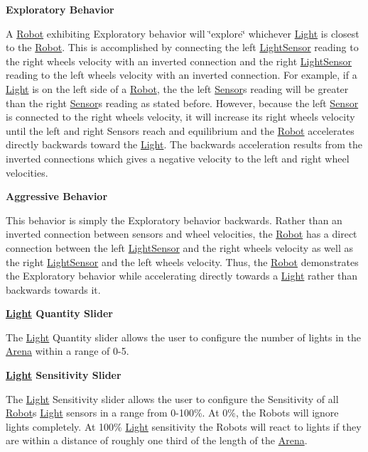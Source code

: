 {\bfseries Exploratory Behavior}

A \hyperlink{classRobot}{Robot} exhibiting Exploratory behavior will \char`\"{}explore\char`\"{} whichever \hyperlink{classLight}{Light} is closest to the \hyperlink{classRobot}{Robot}. This is accomplished by connecting the left \hyperlink{classLightSensor}{Light\+Sensor} reading to the right wheel\textquotesingle{}s velocity with an inverted connection and the right \hyperlink{classLightSensor}{Light\+Sensor} reading to the left wheel\textquotesingle{}s velocity with an inverted connection. For example, if a \hyperlink{classLight}{Light} is on the left side of a \hyperlink{classRobot}{Robot}, the the left \hyperlink{classSensor}{Sensor}\textquotesingle{}s reading will be greater than the right \hyperlink{classSensor}{Sensor}\textquotesingle{}s reading as stated before. However, because the left \hyperlink{classSensor}{Sensor} is connected to the right wheel\textquotesingle{}s velocity, it will increase it\textquotesingle{}s right wheel\textquotesingle{}s velocity until the left and right Sensors reach and equilibrium and the \hyperlink{classRobot}{Robot} accelerates directly backwards toward the \hyperlink{classLight}{Light}. The backwards acceleration results from the inverted connections which gives a negative velocity to the left and right wheel velocities.

{\bfseries Aggressive Behavior}

This behavior is simply the Exploratory behavior backwards. Rather than an inverted connection between sensors and wheel velocities, the \hyperlink{classRobot}{Robot} has a direct connection between the left \hyperlink{classLightSensor}{Light\+Sensor} and the right wheel\textquotesingle{}s velocity as well as the right \hyperlink{classLightSensor}{Light\+Sensor} and the left wheel\textquotesingle{}s velocity. Thus, the \hyperlink{classRobot}{Robot} demonstrates the Exploratory behavior while accelerating directly towards a \hyperlink{classLight}{Light} rather than backwards towards it.

{\bfseries \hyperlink{classLight}{Light} Quantity Slider}

The \hyperlink{classLight}{Light} Quantity slider allows the user to configure the number of lights in the \hyperlink{classArena}{Arena} within a range of 0-\/5.

{\bfseries \hyperlink{classLight}{Light} Sensitivity Slider}

The \hyperlink{classLight}{Light} Sensitivity slider allows the user to configure the Sensitivity of all \hyperlink{classRobot}{Robot}\textquotesingle{}s \hyperlink{classLight}{Light} sensors in a range from 0-\/100\%. At 0\%, the Robots will ignore lights completely. At 100\% \hyperlink{classLight}{Light} sensitivity the Robots will react to lights if they are within a distance of roughly one third of the length of the \hyperlink{classArena}{Arena}.

